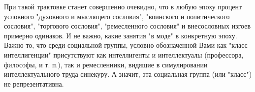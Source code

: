 \begin{itemize}
При такой трактовке станет совершенно очевидно, что в любую эпоху процент
условного "духовного и мыслящего сословия", "воинского и политического
сословия", "торгового сословия", "ремесленного сословия" и внесословных изгоев
примерно одинаков. И не важно, какие занятия "в моде" в конкретную эпоху. Важно
то, что среди социальной группы, условно обозначенной Вами как "класс
интеллигенции" присутствуют как интеллигенты и интеллектуалы (профессора,
философы, и т. п.), так и ремесленники, видящие в симулировании
интеллектуального труда синекуру. А значит, эта социальная группа (или "класс")
не репрезентативна.


\end{itemize} %
